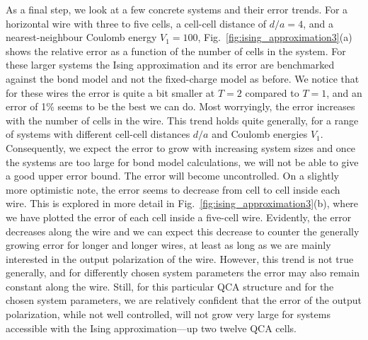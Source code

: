 As a final step, we look at a few concrete systems and their error trends. For a
horizontal wire with three to five cells, a cell-cell distance of $d/a = 4$, and
a nearest-neighbour Coulomb energy $V_1 = 100$,
Fig.~\ref{fig:ising_approximation3}(a) shows the relative error as a function of
the number of cells in the system. For these larger systems the Ising
approximation and its error are benchmarked against the bond model and not the
fixed-charge model as before. We notice that for these wires the error is quite
a bit smaller at $T = 2$ compared to $T = 1$, and an error of 1\% seems to be
the best we can do. Most worryingly, the error increases with the number of
cells in the wire. This trend holds quite generally, for a range of systems with
different cell-cell distances $d/a$ and Coulomb energies $V_1$. Consequently, we
expect the error to grow with increasing system sizes and once the systems are
too large for bond model calculations, we will not be able to give a good upper
error bound. The error will become uncontrolled. On a slightly more optimistic
note, the error seems to decrease from cell to cell inside each wire. This is
explored in more detail in Fig.~\ref{fig:ising_approximation3}(b), where we have
plotted the error of each cell inside a five-cell wire. Evidently, the error
decreases along the wire and we can expect this decrease to counter the
generally growing error for longer and longer wires, at least as long as we are
mainly interested in the output polarization of the wire. However, this trend is
not true generally, and for differently chosen system parameters the error may
also remain constant along the wire. Still, for this particular QCA structure
and for the chosen system parameters, we are relatively confident that the error
of the output polarization, while not well controlled, will not grow very large
for systems accessible with the Ising approximation---up two twelve QCA cells. 
%
